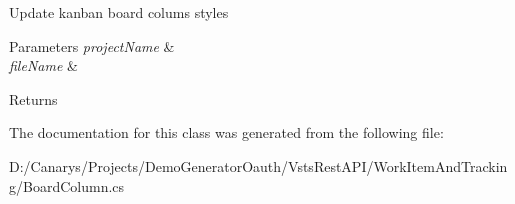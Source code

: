 Update kanban board colums styles 


\begin{DoxyParams}{Parameters}
{\em project\+Name} & \\
\hline
{\em file\+Name} & \\
\hline
\end{DoxyParams}
\begin{DoxyReturn}{Returns}

\end{DoxyReturn}


The documentation for this class was generated from the following file\+:\begin{DoxyCompactItemize}
\item 
D\+:/\+Canarys/\+Projects/\+Demo\+Generator\+Oauth/\+Vsts\+Rest\+A\+P\+I/\+Work\+Item\+And\+Tracking/Board\+Column.\+cs\end{DoxyCompactItemize}
